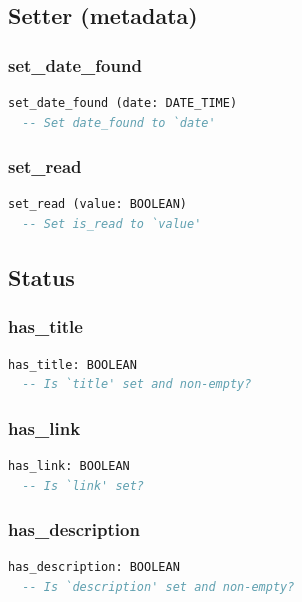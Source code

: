\subsection{Setter (metadata)}
\label{sec:item-setter-metadata}

\subsubsection{set\_date\_found}

\begin{lstlisting}[language=Eiffel]
set_date_found (date: DATE_TIME)
  -- Set date_found to `date'
\end{lstlisting}

\subsubsection{set\_read}

\begin{lstlisting}[language=Eiffel]
set_read (value: BOOLEAN)
  -- Set is_read to `value'
\end{lstlisting}

\subsection{Status}
\label{sec:item-status}

\subsubsection{has\_title}

\begin{lstlisting}[language=Eiffel]
has_title: BOOLEAN
  -- Is `title' set and non-empty?
\end{lstlisting}

\subsubsection{has\_link}

\begin{lstlisting}[language=Eiffel]
has_link: BOOLEAN
  -- Is `link' set?
\end{lstlisting}

\subsubsection{has\_description}

\begin{lstlisting}[language=Eiffel]
has_description: BOOLEAN
  -- Is `description' set and non-empty?
\end{lstlisting}

